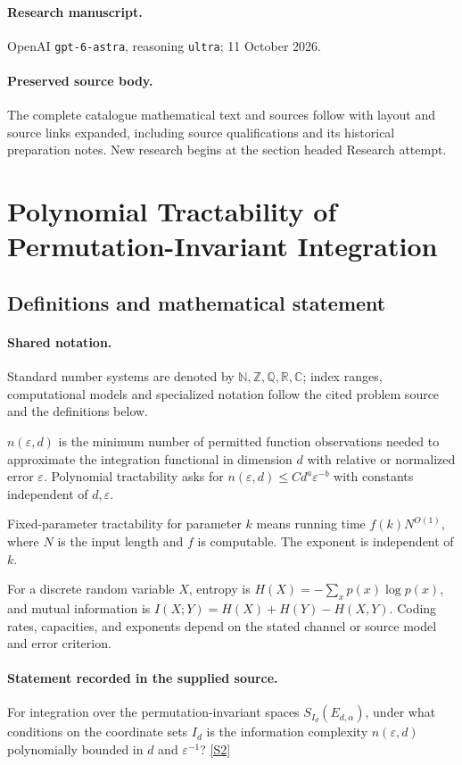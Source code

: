 \documentclass[11pt]{article}
\begin{document}
\paragraph{Research manuscript.} OpenAI \texttt{gpt-6-astra}, reasoning \texttt{ultra}; 11 October 2026.
\paragraph{Preserved source body.} The complete catalogue mathematical text and sources follow with layout and source links expanded, including source qualifications and its historical preparation notes. New research begins at the section headed Research attempt.

\section{Polynomial Tractability of Permutation-Invariant Integration}\label{statement}

\subsection{Definitions and mathematical statement}

\paragraph{Shared notation.}Standard number systems are denoted by $\mathbb N,\mathbb Z,\mathbb Q,\mathbb R,\mathbb C$; index ranges, computational models and specialized notation follow the cited problem source and the definitions below.


$n(\varepsilon,d)$ is the minimum number of permitted function observations needed to approximate the integration functional in dimension $d$ with relative or normalized error $\varepsilon$. Polynomial tractability asks for $n(\varepsilon,d)\leq C d^a\varepsilon^{-b}$ with constants independent of $d,\varepsilon$.

Fixed-parameter tractability for parameter $k$ means running time $f(k)N^{O(1)}$, where $N$ is the input length and $f$ is computable. The exponent is independent of $k$.

For a discrete random variable $X$, entropy is $H(X)=-\sum_xp(x)\log p(x)$, and mutual information is $I(X;Y)=H(X)+H(Y)-H(X,Y)$. Coding rates, capacities, and exponents depend on the stated channel or source model and error criterion.
\paragraph{Statement recorded in the supplied source.}
For integration over the permutation-invariant spaces $S_{I_d}(E_{d,\alpha})$, under what conditions on the coordinate sets $I_d$ is the information complexity $n(\varepsilon,d)$ polynomially bounded in $d$ and $\varepsilon^{-1}$? \href{https://doi.org/10.4171/owr/2013/49}{[S2]}
\end{document}
